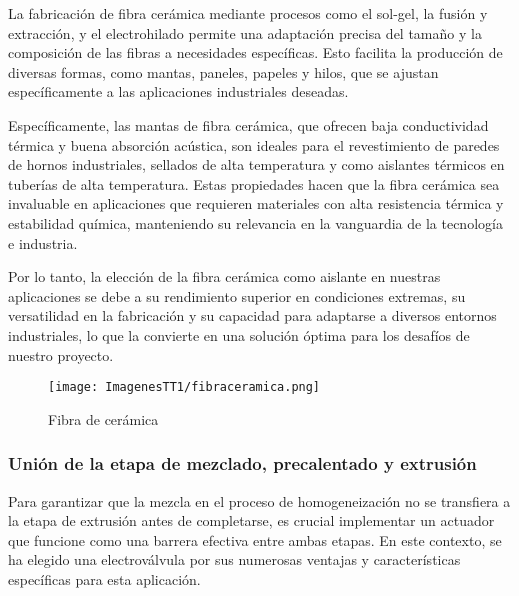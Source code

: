 \documentclass[14pt,oneside]{extarticle} %
\begin{document}
La fabricación de fibra cerámica mediante procesos como el sol-gel, la fusión y extracción, y el electrohilado permite una adaptación precisa del tamaño y la composición de las fibras a necesidades específicas. Esto facilita la producción de diversas formas, como mantas, paneles, papeles y hilos, que se ajustan específicamente a las aplicaciones industriales deseadas.

Específicamente, las mantas de fibra cerámica, que ofrecen baja conductividad térmica y buena absorción acústica, son ideales para el revestimiento de paredes de hornos industriales, sellados de alta temperatura y como aislantes térmicos en tuberías de alta temperatura. Estas propiedades hacen que la fibra cerámica sea invaluable en aplicaciones que requieren materiales con alta resistencia térmica y estabilidad química, manteniendo su relevancia en la vanguardia de la tecnología e industria.

\newpage

Por lo tanto, la elección de la fibra cerámica como aislante en nuestras aplicaciones se debe a su rendimiento superior en condiciones extremas, su versatilidad en la fabricación y su capacidad para adaptarse a diversos entornos industriales, lo que la convierte en una solución óptima para los desafíos de nuestro proyecto.


\begin{figure}[H]
    \centering
    \texttt{[image: ImagenesTT1/fibraceramica.png]}
    \caption{Fibra de cerámica}
    \label{fig:fibraceramica}
\end{figure}

\subsubsection{Unión de la etapa de mezclado, precalentado y extrusión}

Para garantizar que la mezcla en el proceso de homogeneización no se transfiera a la etapa de extrusión antes de completarse, es crucial implementar un actuador que funcione como una barrera efectiva entre ambas etapas. En este contexto, se ha elegido una electroválvula por sus numerosas ventajas y características específicas para esta aplicación.
\end{document}
